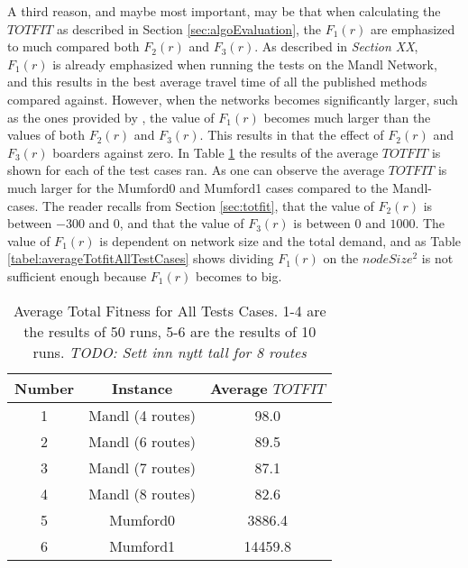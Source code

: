 A third reason, and maybe most important, may be that when calculating the $TOTFIT$ as described in Section \vref{sec:algoEvaluation}, the $F_1(r)$ are emphasized to much compared both $F_2(r)$ and $F_3(r)$. As described in \emph{\color{blue} Section XX}, $F_1(r)$ is already emphasized when running the tests on the Mandl Network, and this results in the best average travel time of all the published methods compared against. However, when the networks becomes significantly larger, such as the ones provided by \citet{mumford13}, the value of $F_1(r)$ becomes much larger than the values of both $F_2(r)$ and $F_3(r)$. This results in that the effect of $F_2(r)$ and $F_3(r)$ boarders against zero. In Table \ref{tabel:averageTotfitAllTestCases} the results of the average $TOTFIT$ is shown for each of the test cases ran. As one can observe the average $TOTFIT$ is much larger for the Mumford0 and Mumford1 cases compared to the Mandl-cases. The reader recalls from Section \vref{sec:totfit}, that the value of $F_2(r)$ is between $-300$ and $0$, and that the value of $F_3(r)$ is between $0$ and $1000$. The value of $F_1(r)$ is dependent on network size and the total demand, and as Table \vref{tabel:averageTotfitAllTestCases} shows dividing $F_1(r)$ on the $nodeSize^2$ is not sufficient enough because $F_1(r)$ becomes to big. 

\begin{table}[H]
    \centering
    \hspace*{-1.0cm}
    \begin{tabular}{|c|c|c|}
        \hline
        \textbf{Number} & \textbf{Instance} & \textbf{Average $TOTFIT$}\\
        \hline
        1 & Mandl (4 routes) & 98.0\\
        \hline
        2 & Mandl (6 routes) & 89.5\\
        \hline
        3 & Mandl (7 routes) & 87.1\\
        \hline
        4 & Mandl (8 routes) & 82.6\\
        \hline
        5 & Mumford0 & 3886.4\\
        \hline
        6 & Mumford1 & 14459.8\\
        \hline
    \end{tabular}
    \caption{Average Total Fitness for All Tests Cases. 1-4 are the results of 50 runs, 5-6 are the results of 10 runs. \emph{\color{blue} TODO: Sett inn nytt tall for 8 routes}}
    \label{tabel:averageTotfitAllTestCases}
\end{table}

